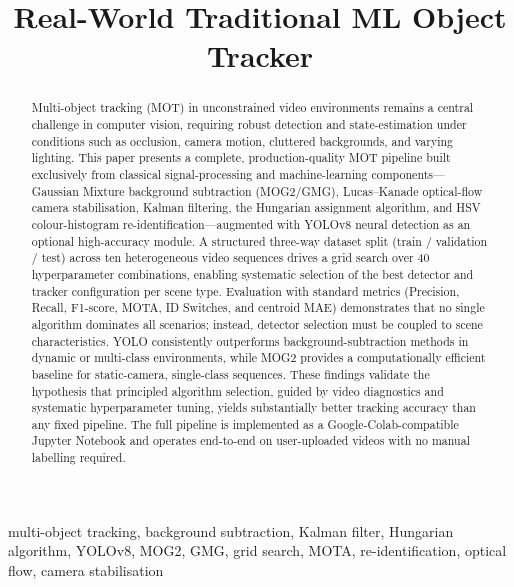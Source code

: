 \documentclass[10pt, conference, compsocconf]{IEEEtran}
\title{\Huge Real-World Traditional ML Object Tracker}
\author{\vspace{-2em}} %
\begin{document}
\maketitle
\thispagestyle{fancy}

\begin{abstract}
Multi-object tracking (MOT) in unconstrained video environments
remains a central challenge in computer vision, requiring robust
detection and state-estimation under conditions such as occlusion,
camera motion, cluttered backgrounds, and varying lighting.
This paper presents a complete, production-quality MOT pipeline
built exclusively from classical signal-processing and machine-learning
components---Gaussian Mixture background subtraction (MOG2/GMG),
Lucas--Kanade optical-flow camera stabilisation, Kalman filtering,
the Hungarian assignment algorithm, and HSV colour-histogram
re-identification---augmented with YOLOv8 neural detection as an
optional high-accuracy module. A structured three-way dataset split
(train / validation / test) across ten heterogeneous video sequences
drives a grid search over 40 hyperparameter combinations, enabling
systematic selection of the best detector and tracker configuration
per scene type. Evaluation with standard metrics (Precision, Recall,
F1-score, MOTA, ID Switches, and centroid MAE) demonstrates that no
single algorithm dominates all scenarios; instead, detector selection
must be coupled to scene characteristics. YOLO consistently outperforms
background-subtraction methods in dynamic or multi-class environments,
while MOG2 provides a computationally efficient baseline for
static-camera, single-class sequences. These findings validate the
hypothesis that principled algorithm selection, guided by video
diagnostics and systematic hyperparameter tuning, yields substantially
better tracking accuracy than any fixed pipeline. The full pipeline
is implemented as a Google-Colab-compatible Jupyter Notebook and
operates end-to-end on user-uploaded videos with no manual labelling
required.
\end{abstract}

\begin{IEEEkeywords}
multi-object tracking, background subtraction, Kalman filter,
Hungarian algorithm, YOLOv8, MOG2, GMG, grid search, MOTA,
re-identification, optical flow, camera stabilisation
\end{IEEEkeywords}
\end{document}
